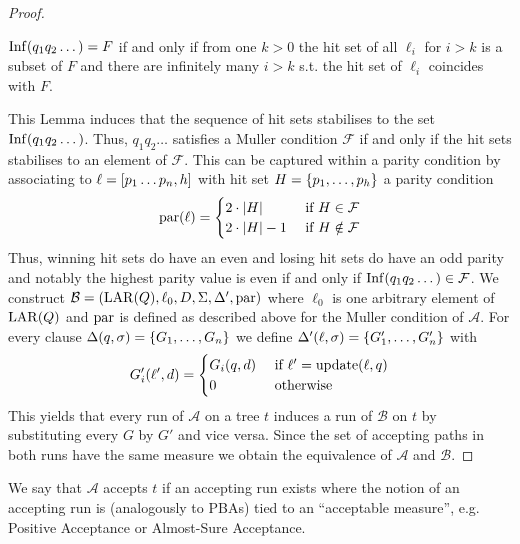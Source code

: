 \begin{proof}
  \begin{lemma}
    \cite[Lemma 2.1]{MullerSchupp}
    $\operatorname{Inf}(q_{1}q_{2}\dots) = F$ if and only if from one $k>0$ the hit set of
    all $\ell_{i}$ for $i>k$ is a subset of $F$ and there are infinitely many
    $i>k$ s.t. the hit set of $\ell_{i}$ coincides with $F$.
  \end{lemma}
  This Lemma induces that the sequence of hit sets stabilises to the set
  $\operatorname{Inf}(q_{1}q_{2}\dots)$. Thus, $q_{1}q_{2}\dots$ satisfies a Muller condition
  $\mathcal{F}$ if and only if the hit sets stabilises to an element of
  $\mathcal{F}$. This can be captured within a parity condition by associating
  to $\ell = \left[p_{1}\dots p_{n},h\right]$ with hit set
  $H = \left\{p_{1},\dots,p_{h}\right\}$ a parity condition
  \begin{equation*}
    \operatorname{par}(\ell) = \begin{cases}
      2\cdot\left\vert{H}\right\vert &\text{ if }H\in\mathcal{F}\\
      2\cdot\left\vert{H}\right\vert-1 &\text{ if }H\notin\mathcal{F}
    \end{cases}
  \end{equation*}
  Thus, winning hit sets do have an even and losing hit sets do have an odd
  parity and notably the highest parity value is even if and only if
  $\operatorname{Inf}(q_{1}q_{2}\dots)\in\mathcal{F}$.
  We construct
  $\mathcal{B}=\left(\operatorname{LAR}(Q),\ell_{0}, D, \Sigma, \Delta',\operatorname{par}\right)$ where
  $\ell_{0}$ is one arbitrary element of $\operatorname{LAR}(Q)$ and $\operatorname{par}$ is defined as
  described above for the Muller condition of $\mathcal{A}$. For every clause
  $\Delta(q,\sigma) = \left\{G_{1},\dots,G_{n}\right\}$ we define
  $\Delta'(\ell,\sigma) = \left\{G_{1}',\dots,G_{n}'\right\}$ with
  \begin{equation*}
    G_{i}'(\ell', d) = \begin{cases}
      G_{i}(q,d) &\text{ if }\ell' = \operatorname{update}(\ell,q)\\
      0          &\text{ otherwise}
    \end{cases}
  \end{equation*}
  This yields that every run of $\mathcal{A}$ on a tree $t$ induces a run of
  $\mathcal{B}$ on $t$ by substituting every $G$ by $G'$ and vice versa. Since
  the set of accepting paths in both runs have the same measure we obtain the
  equivalence of $\mathcal{A}$ and $\mathcal{B}$.
\end{proof}
We say that $\mathcal{A}$ accepts $t$ if an accepting run exists where the
notion of an accepting run is (analogously to \acp{PBA}) tied to an
\enquote{acceptable measure}, e.g. Positive Acceptance or Almost-Sure
Acceptance.

